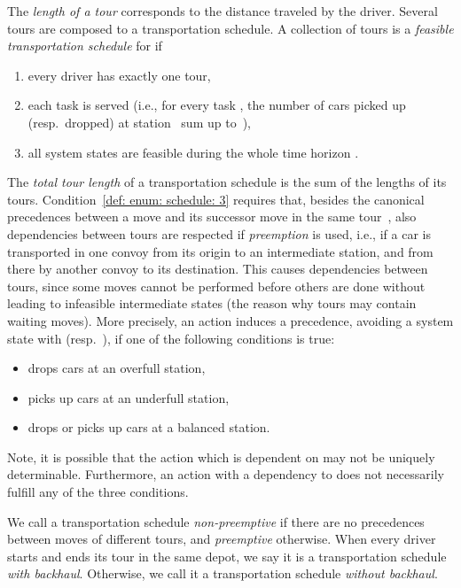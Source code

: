 \documentclass[english]{llncs}
\numberwithin{sublemma}{lemma}
\begin{document}
The \emph{length of a tour} corresponds to the distance traveled by the driver.
Several tours are composed to a transportation schedule. 
A collection of tours  is a \emph{feasible transportation schedule}  for  if 
\begin{enumerate}
 \item\label{def: enum: schedule: 1} every driver has exactly one tour,
 \item\label{def: enum: schedule: 2} each task  is served (i.e., for every task , the number of cars picked up (resp.~dropped) at station~ sum up to~),
 \item\label{def: enum: schedule: 3} all system states  are feasible during the whole time horizon . 
\end{enumerate}
The \emph{total tour length} of a transportation schedule is the sum of the lengths of its tours.
Condition~\ref{def: enum: schedule: 3} requires that, besides the canonical precedences between a move  and its successor move  in the same tour~,
also dependencies between tours are respected
if \emph{preemption} is used, i.e., if a car is transported in one convoy from its origin to an intermediate station, and from there by another convoy to its destination.
This causes dependencies between tours, since some moves cannot be performed before others are done without leading to infeasible intermediate states (the reason why tours may contain waiting moves).
More precisely, an action  induces a precedence, avoiding a system state  with  (resp.~),
if one of the following conditions is true:
\begin{itemize}
\item  drops cars at an overfull station,
\item  picks up cars at an underfull station,
\item  drops or picks up cars at a balanced station.
\end{itemize}
Note, it is possible that the action which is dependent on  may not be uniquely determinable.
Furthermore, an action with a dependency to  does not necessarily fulfill any of the three conditions.



We call a transportation schedule \emph{non-preemptive} if there are no precedences between moves of different tours, and \emph{preemptive} otherwise.
When every driver starts and ends its tour in the same depot, we say it is a transportation schedule \emph{with backhaul}.
Otherwise, we call it a transportation schedule \emph{without backhaul}.
\end{document}
